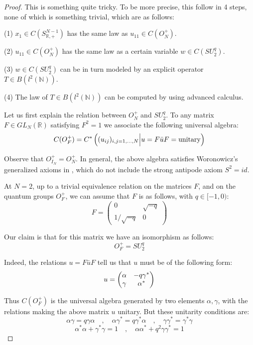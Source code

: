 \documentclass[12pt]{amsbook}
\begin{document}
\begin{proof}
This is something quite tricky. To be more precise, this follow in 4 steps, none of which is something trivial, which are as follows:

\medskip

(1) $x_1\in C(S^{N-1}_{\mathbb R,+})$ has the same law as $u_{11}\in C(O_N^+)$.

\medskip

(2) $u_{11}\in C(O_N^+)$ has the same law as a certain variable $w\in C(SU^q_2)$.

\medskip

(3) $w\in C(SU^q_2)$ can be in turn modeled by an explicit operator $T\in B(l^2(\mathbb N))$.

\medskip

(4) The law of $T\in B(l^2(\mathbb N))$ can be computed by using advanced calculus.

\medskip

Let us first explain the relation between $O_N^+$ and $SU^q_2$. To any matrix $F\in GL_N(\mathbb R)$ satisfying $F^2=1$ we associate the following universal algebra:
$$C(O_F^+)=C^*\left((u_{ij})_{i,j=1,\ldots,N}\Big|u=F\bar{u}F={\rm unitary}\right)$$

Observe that $O_{I_N}^+=O_N^+$. In general, the above algebra satisfies Woronowicz's generalized axioms in \cite{wo1}, which do not include the strong antipode axiom $S^2=id$.

\medskip

At $N=2$, up to a trivial equivalence relation on the matrices $F$, and on the quantum groups $O_F^+$, we can assume that $F$ is as follows, with $q\in [-1,0)$:
$$F=\begin{pmatrix}0&\sqrt{-q}\\
1/\sqrt{-q}&0\end{pmatrix}$$

Our claim is that for this matrix we have an isomorphism as follows:
$$O_F^+=SU^q_2$$

Indeed, the relations $u=F\bar{u}F$ tell us that $u$ must be of the following form:
$$u=\begin{pmatrix}\alpha&-q\gamma^*\cr \gamma&\alpha^*\end{pmatrix}$$

Thus $C(O_F^+)$ is the universal algebra generated by two elements $\alpha,\gamma$, with the relations making the above matrix $u$ unitary. But these unitarity conditions are:
$$\alpha\gamma=q\gamma\alpha\quad,\quad
\alpha\gamma^*=q\gamma^*\alpha\quad,\quad 
\gamma\gamma^*=\gamma^*\gamma$$
$$\alpha^*\alpha+\gamma^*\gamma=1\quad,\quad 
\alpha\alpha^*+q^2\gamma\gamma^*=1$$


\end{proof}
\end{document}
